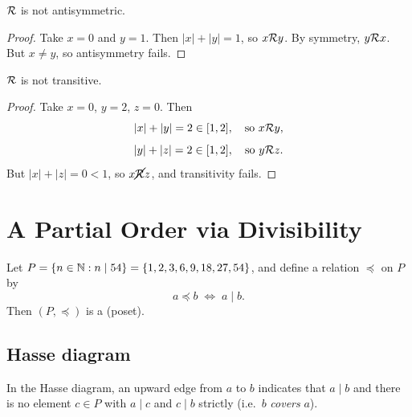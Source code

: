 \begin{proposition}
$\mathcal{R}$ is not antisymmetric.
\end{proposition}
\begin{proof}
Take $x = 0$ and $y = 1$. Then $|x|+|y| = 1$, so $x \mathcal{R} y$.
By symmetry, $y \mathcal{R} x$. But $x \neq y$, so antisymmetry fails.
\end{proof}

\begin{proposition}
$\mathcal{R}$ is not transitive.
\end{proposition}
\begin{proof}
Take $x = 0$, $y = 2$, $z = 0$. Then
\[
    |x|+|y| = 2 \in [1,2],\quad \text{so } x \mathcal{R} y,
\]
\[
    |y|+|z| = 2 \in [1,2],\quad \text{so } y \mathcal{R} z.
\]
But $|x|+|z| = 0 < 1$, so $x \cancel{\mathcal{R}} z$, and transitivity fails.
\end{proof}

\section{A Partial Order via Divisibility}

\begin{definition}
Let $P = \{n \in \mathbb{N} : n \mid 54\} = \{1,2,3,6,9,18,27,54\}$, and define a
relation $\preceq$ on $P$ by
\[
    a \preceq b \;\iff\; a \mid b.
\]
Then $(P, \preceq)$ is a  (poset).
\end{definition}

\subsection{Hasse diagram}

In the Hasse diagram, an upward edge from $a$ to $b$ indicates that $a \mid b$
and there is no element $c \in P$ with $a \mid c$ and $c \mid b$ strictly
(i.e.\ $b$ \emph{covers} $a$).

\begin{center}
\end{center}

